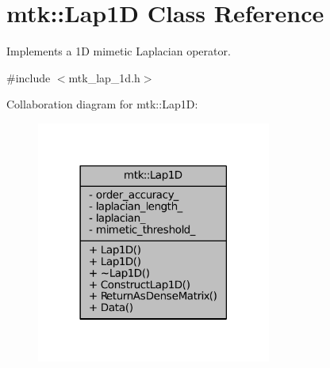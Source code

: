 \hypertarget{classmtk_1_1Lap1D}{\section{mtk\-:\-:Lap1\-D Class Reference}
\label{classmtk_1_1Lap1D}
}


Implements a 1\-D mimetic Laplacian operator.  




{\ttfamily \#include $<$mtk\-\_\-lap\-\_\-1d.\-h$>$}



Collaboration diagram for mtk\-:\-:Lap1\-D\-:\nopagebreak
\begin{figure}[H]
\begin{center}
\leavevmode
\includegraphics[width=218pt]{classmtk_1_1Lap1D__coll__graph}
\end{center}
\end{figure}
